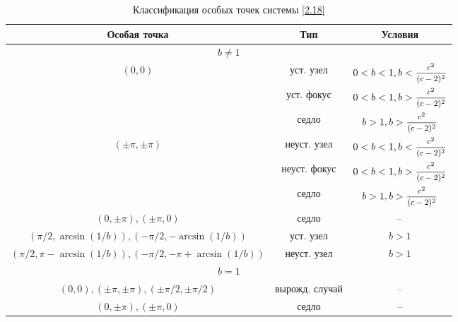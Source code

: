 \documentclass[a4paper,12pt, openany]{book}
\theoremstyle{plain} %
\theoremstyle{definition} %
\theoremstyle{remark} %
\numberwithin{equation}{chapter}
\begin{document}
{\begin{table}[h!]
\centering
\begin{tabular}{|l|l|c|}
\hline
\multicolumn{1}{|c|}{Особая точка}                        & \multicolumn{1}{c|}{Тип}                & Условия \\ \hline
\multicolumn{3}{|c|}{$b\neq 1$}                                                                               \\ \hline
\multicolumn{1}{|c|}{\multirow{3}{*}{$(0,0)$}}            & \multicolumn{1}{c|}{уст. узел}    & $0<b<1, b < \mfrac{c^2}{(c-2)^2}$        \\ \cline{2-3} 
\multicolumn{1}{|c|}{}                                    & \multicolumn{1}{c|}{уст. фокус}   & $0<b<1, b > \mfrac{c^2}{(c-2)^2}$        \\ \cline{2-3} 
\multicolumn{1}{|c|}{}                                    & \multicolumn{1}{c|}{седло}              & $b>1, b > \mfrac{c^2}{(c-2)^2}$        \\ \hline
\multicolumn{1}{|c|}{\multirow{3}{*}{$(\pm\pi, \pm\pi)$}} & \multicolumn{1}{c|}{неуст. узел}  & $0<b<1, b < \mfrac{c^2}{(c-2)^2}$        \\ \cline{2-3} 
\multicolumn{1}{|c|}{}                                    & \multicolumn{1}{c|}{неуст. фокус} & $0<b<1, b > \mfrac{c^2}{(c-2)^2}$        \\ \cline{2-3} 
\multicolumn{1}{|c|}{}                                    & \multicolumn{1}{c|}{седло}              & $b>1, b > \mfrac{c^2}{(c-2)^2}$         \\ \hline
\multicolumn{1}{|c|}{$(0, \pm\pi), (\pm\pi,0)$}           & \multicolumn{1}{c|}{седло}              & --      \\ \hline
\multicolumn{1}{|c|}{$(\pi/2, \arcsin(1/b)),(-\pi/2, -\arcsin(1/b)) $}                                    & \multicolumn{1}{c|}{уст. узел}    &   $b>1$      \\ \hline
\multicolumn{1}{|c|}{$(\pi/2, \pi - \arcsin(1/b)),(-\pi/2, -\pi + \arcsin(1/b))$}                                    & \multicolumn{1}{c|}{неуст. узел}  & $b>1$         \\ \hline
\multicolumn{3}{|c|}{$b=1$}                                                                                   \\ \hline
\multicolumn{1}{|c|}{$(0,0), (\pm\pi, \pm\pi), (\pm\pi/2, \pm\pi/2)$}                                    & \multicolumn{1}{c|}{вырожд. случай} & --      \\ \hline
\multicolumn{1}{|c|}{$(0, \pm\pi), (\pm\pi,0)$}                                    & \multicolumn{1}{c|}{седло}              & --      \\ \hline
\end{tabular}
\caption{Классификация особых точек системы \eqref{2.18} }
\label{tab:my-table}
\end{table}

}
\end{document}
